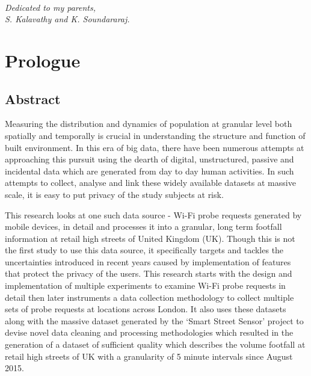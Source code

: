 
\cleardoublepage
~\vfill
\begin{doublespace}
\noindent\fontsize{12}{12}\selectfont\itshape \nohyphenation
\noindent Dedicated to my parents,\\
\noindent S. Kalavathy and K. Soundararaj.
\end{doublespace}
\vfill
\vfill

\chapter*{Prologue}

\section*{Abstract} 

Measuring the distribution and dynamics of population at granular level both spatially and temporally is crucial in understanding the structure and function of built environment.
In this era of big data, there have been numerous attempts at approaching this pursuit using the dearth of digital, unstructured, passive and incidental data which are generated from day to day human activities.
In such attempts to collect, analyse and link these widely available datasets at massive scale, it is easy to put privacy of the study subjects at risk.

This research looks at one such data source - Wi-Fi probe requests generated by mobile devices, in detail and processes it into a granular, long term footfall information at retail high streets of United Kingdom (UK).
Though this is not the first study to use this data source, it specifically targets and tackles the uncertainties introduced in recent years caused by implementation of features that protect the privacy of the users.
This research starts with the design and implementation of multiple experiments to examine Wi-Fi probe requests in detail then later instruments a data collection methodology to collect multiple sets of probe requests at locations across London.
It also uses these datasets along with the massive dataset generated by the `Smart Street Sensor' project to devise novel data cleaning and processing methodologies which resulted in the generation of a dataset of sufficient quality which  describes the volume footfall at retail high streets of UK with a granularity of 5 minute intervals since August 2015.


